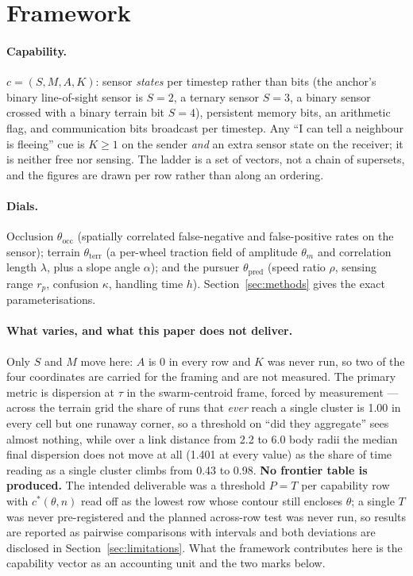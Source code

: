 \documentclass[11pt,a4paper]{article}
\begin{document}
\section{Framework}
\label{sec:framework}

\paragraph{Capability.} $c = (S, M, A, K)$: sensor \emph{states} per timestep
rather than bits (the anchor's binary line-of-sight sensor is $S = 2$, a ternary
sensor $S = 3$, a binary sensor crossed with a binary terrain bit $S = 4$),
persistent memory bits, an arithmetic flag, and communication bits broadcast per
timestep. Any ``I can tell a neighbour is fleeing'' cue is $K \ge 1$ on the sender
\emph{and} an extra sensor state on the receiver; it is neither free nor sensing.
The ladder is a set of vectors, not a chain of supersets, and the figures are
drawn per row rather than along an ordering.

\paragraph{Dials.} Occlusion $\theta_{\mathrm{occ}}$ (spatially correlated
false-negative and false-positive rates on the sensor); terrain
$\theta_{\mathrm{terr}}$ (a per-wheel traction field of amplitude $\theta_m$ and
correlation length $\lambda$, plus a slope angle $\alpha$); and the pursuer
$\theta_{\mathrm{pred}}$ (speed ratio $\rho$, sensing range $r_p$, confusion
$\kappa$, handling time $h$). Section~\ref{sec:methods} gives the exact
parameterisations.

\paragraph{What varies, and what this paper does not deliver.} Only $S$ and $M$
move here: $A$ is 0 in every row and $K$ was never run, so two of the four
coordinates are carried for the framing and are not measured. The primary metric
is dispersion at $\tau$ in the swarm-centroid frame, forced by measurement ---
across the terrain grid the share of runs that \emph{ever} reach a single cluster
is 1.00 in every cell but one runaway corner, so a threshold on ``did they
aggregate'' sees almost nothing, while over a link distance from 2.2 to 6.0 body
radii the median final dispersion does not move at all (1.401 at every value) as
the share of time reading as a single cluster climbs from 0.43 to 0.98.
\textbf{No frontier table is produced.} The intended deliverable was a threshold
$P = T$ per capability row with $c^*(\theta, n)$ read off as the lowest row whose
contour still encloses $\theta$; a single $T$ was never pre-registered and the
planned across-row test was never run, so results are reported as pairwise
comparisons with intervals and both deviations are disclosed in
Section~\ref{sec:limitations}. What the framework contributes here is the
capability vector as an accounting unit and the two marks below.
\end{document}
